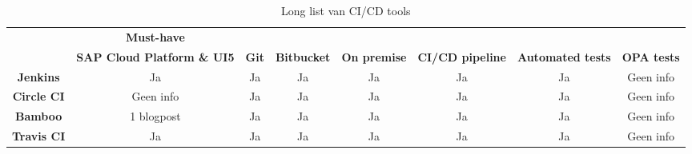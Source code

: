             
            \begin{landscape}
                \begin{table}[]
                    \centering
                    \label{tab:long-list}
                    \begin{tabular}{c|c|cccccc}
                        \cline{2-2}
                        \textbf{} & \textbf{Must-have} & \textbf{} & \textbf{} & \textbf{} & \textbf{} & \textbf{} & \textbf{} \\ \cline{2-8} 
                        & \textbf{SAP Cloud Platform \& UI5} & \multicolumn{1}{c|}{\textbf{Git}} & \multicolumn{1}{c|}{\textbf{Bitbucket}} & \multicolumn{1}{c|}{\textbf{On premise}} & \multicolumn{1}{c|}{\textbf{CI/CD pipeline}} & \multicolumn{1}{c|}{\textbf{Automated tests}} & \multicolumn{1}{c|}{\textbf{OPA tests}} \\ \hline
                        \multicolumn{1}{|c|}{\textbf{Jenkins}} & Ja & \multicolumn{1}{c|}{Ja} & \multicolumn{1}{c|}{Ja} & \multicolumn{1}{c|}{Ja} & \multicolumn{1}{c|}{Ja} & \multicolumn{1}{c|}{Ja} & \multicolumn{1}{c|}{Geen info} \\ \hline
                        \multicolumn{1}{|c|}{\textbf{Circle CI}} & Geen info & \multicolumn{1}{c|}{Ja} & \multicolumn{1}{c|}{Ja} & \multicolumn{1}{c|}{Ja} & \multicolumn{1}{c|}{Ja} & \multicolumn{1}{c|}{Ja} & \multicolumn{1}{c|}{Geen info} \\ \hline
                        \multicolumn{1}{|c|}{\textbf{Bamboo}} & 1 blogpost & \multicolumn{1}{c|}{Ja} & \multicolumn{1}{c|}{Ja} & \multicolumn{1}{c|}{Ja} & \multicolumn{1}{c|}{Ja} & \multicolumn{1}{c|}{Ja} & \multicolumn{1}{c|}{Geen info} \\ \hline
                        \multicolumn{1}{|c|}{\textbf{Travis CI}} & Ja & \multicolumn{1}{c|}{Ja} & \multicolumn{1}{c|}{Ja} & \multicolumn{1}{c|}{Ja} & \multicolumn{1}{c|}{Ja} & \multicolumn{1}{c|}{Ja} & \multicolumn{1}{c|}{Geen info} \\ \hline
                    \end{tabular}
                    \caption{Long list van CI/CD tools}
                \end{table}
            \end{landscape}
        
